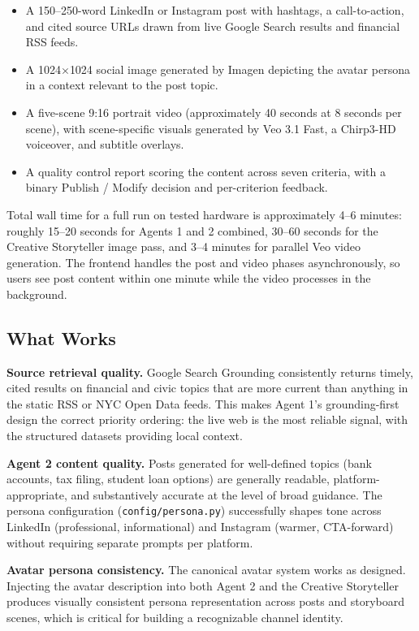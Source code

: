 \documentclass[12pt, letterpaper]{article}
\begin{document}
\begin{itemize}[leftmargin=1.5em]
  \item A 150--250-word LinkedIn or Instagram post with hashtags, a call-to-action,
    and cited source URLs drawn from live Google Search results and financial RSS feeds.
  \item A 1024$\times$1024 social image generated by Imagen depicting the avatar
    persona in a context relevant to the post topic.
  \item A five-scene 9:16 portrait video (approximately 40 seconds at 8 seconds per
    scene), with scene-specific visuals generated by Veo 3.1 Fast, a Chirp3-HD
    voiceover, and subtitle overlays.
  \item A quality control report scoring the content across seven criteria, with a
    binary Publish / Modify decision and per-criterion feedback.
\end{itemize}

Total wall time for a full run on tested hardware is approximately 4--6 minutes: roughly
15--20 seconds for Agents 1 and 2 combined, 30--60 seconds for the Creative Storyteller
image pass, and 3--4 minutes for parallel Veo video generation. The frontend handles
the post and video phases asynchronously, so users see post content within one minute
while the video processes in the background.

\subsection{What Works}

\textbf{Source retrieval quality.} Google Search Grounding consistently returns timely,
cited results on financial and civic topics that are more current than anything in the
static RSS or NYC Open Data feeds. This makes Agent 1's grounding-first design the
correct priority ordering: the live web is the most reliable signal, with the structured
datasets providing local context.

\textbf{Agent 2 content quality.} Posts generated for well-defined topics (bank accounts,
tax filing, student loan options) are generally readable, platform-appropriate, and
substantively accurate at the level of broad guidance. The persona configuration
(\texttt{config/persona.py}) successfully shapes tone across LinkedIn (professional,
informational) and Instagram (warmer, CTA-forward) without requiring separate prompts
per platform.

\textbf{Avatar persona consistency.} The canonical avatar system works as designed.
Injecting the avatar description into both Agent 2 and the Creative Storyteller produces
visually consistent persona representation across posts and storyboard scenes, which
is critical for building a recognizable channel identity.
\end{document}
